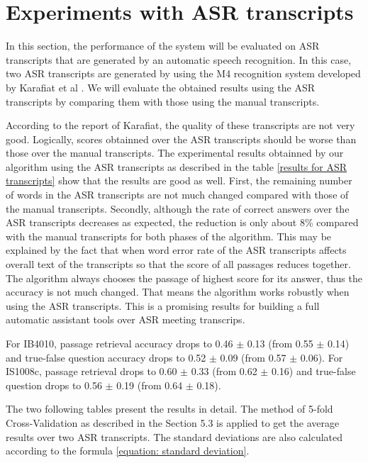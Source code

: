 \section{Experiments with ASR transcripts}

In this section, the performance of the system will be evaluated on ASR transcripts that are generated by an automatic speech recognition. In this case, two ASR transcripts are generated by using the M4 recognition system developed by Karafiat et al \cite{ASR_transcrips}. We will evaluate the obtained results using the ASR transcripts by comparing them with those using the manual transcripts.

According to the report of Karafiat, the quality  of these transcripts are not very good. Logically, scores obtainned over the ASR transcripts should be worse than those over the manual transcripts. The experimental results obtainned by our algorithm using the ASR transcripts as described in the table \ref{results for ASR transcripts} show that the results are good as well. First, the remaining number of words in the ASR transcripts are not much changed compared with those of the manual transcripts. Secondly, although the rate of correct answers over the ASR transcripts decreases as expected, the reduction is only about 8\% compared with the manual transcripts for both phases of the algorithm. This may be explained by the fact that when word error rate of the ASR transcripts affects overall text of the transcripts so that the score of all passages reduces together. The algorithm always chooses the passage of highest score for its answer, thus the accuracy is not much changed. That means the algorithm works robustly when using the ASR transcripts. This is a promising results for building a full automatic assistant tools over ASR meeting transcrips. 

For IB4010, passage retrieval accuracy drops to 0.46 \ensuremath{\pm} 0.13 (from 0.55 \ensuremath{\pm} 0.14) and true-false question accuracy drops to 0.52 \ensuremath{\pm} 0.09 (from 0.57 \ensuremath{\pm} 0.06). For IS1008c, passage retrieval drops to 0.60 \ensuremath{\pm} 0.33 (from 0.62 \ensuremath{\pm} 0.16) and true-false question drops to 0.56 \ensuremath{\pm} 0.19 (from 0.64 \ensuremath{\pm} 0.18).

The two following tables present the results in detail. The method of 5-fold Cross-Validation as described in the Section 5.3 is applied to get the average results over two ASR transcripts. The standard deviations are also calculated according to the formula \ref{equation: standard deviation}.

